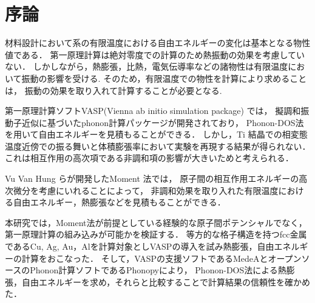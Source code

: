 \chapter{序論}

材料設計において系の有限温度における自由エネルギーの変化は基本となる物性値である．
第一原理計算は絶対零度での計算のため熱振動の効果を考慮していない．
しかしながら，熱膨張，比熱，電気伝導率などの諸物性は有限温度において振動の影響を受ける. 
そのため，有限温度での物性を計算により求めることは，
振動の効果を取り入れて計算することが必要となる.

第一原理計算ソフトVASP(Vienna ab initio simulation package) では，
擬調和振動子近似に基づいたphonon計算パッケージが開発されており，
Phonon-DOS法を用いて自由エネルギーを見積もることができる\cite{phonon}．
しかし，Ti 結晶での相変態温度近傍での振る舞いと体積膨張率において実験を再現する結果が得られない\cite{kiyohara}．
これは相互作用の高次項である非調和項の影響が大きいためと考えられる．

Vu Van Hung らが開発したMoment 法では，
原子間の相互作用エネルギーの高次微分を考慮にいれることによって，
非調和効果を取り入れた有限温度における自由エネルギー，熱膨張などを見積もることができる\cite{jindo}．

本研究では，Moment法が前提としている経験的な原子間ポテンシャルでなく，第一原理計算の組み込みが可能かを検証する．
等方的な格子構造を持つfcc金属であるCu, Ag, Au，Alを計算対象としVASPの導入を試み熱膨張，自由エネルギーの計算をおこなった．
そして，VASPの支援ソフトであるMedeAとオープンソースのPhonon計算ソフトであるPhonopyにより，
Phonon-DOS法による熱膨張，自由エネルギーを求め，それらと比較することで計算結果の信頼性を確かめた．

